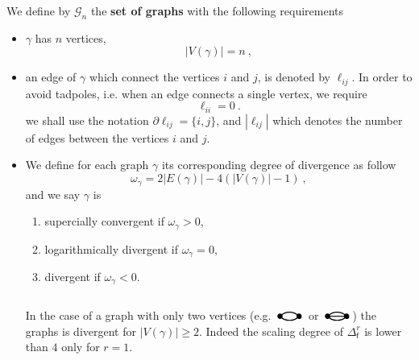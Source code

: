\documentclass[11pt]{book}
\newcommand{\abs}[1]{\left|#1\right|}
\newcommand{\Gcal}{\mathcal{G}}
\newcommand{\fsf}{\mathsf{f}}
\theoremstyle{break}
\newcommand{\FtwoG}{\begin{tikzpicture}[thick,scale=1.5]
\useasboundingbox (-0.1,-0.07) rectangle (0.5,0.4);
\filldraw (0,0) circle (1.3pt);
\filldraw (0.4,0) circle (1.3pt);
\draw (0,0) edge [out=45,in=135] node[above] {} (0.4,0);
\draw (0,0) edge [out=-45,in=-135] node[above] {} (0.4,0);
\end{tikzpicture} }
\newcommand{\FthreeG}{\begin{tikzpicture}[thick,scale=1.5]
\useasboundingbox (-0.1,-0.07) rectangle (0.5,0.4);
\filldraw (0,0) circle (1.3pt);
\filldraw (0.4,0) circle (1.3pt);
\draw (0,0) edge [out=45,in=135] node[above] {} (0.4,0);
\draw (0,0) -- (0.4,0);
\draw (0,0) edge [out=-45,in=-135] node[above] {} (0.4,0);
\end{tikzpicture} }
\begin{document}
We define by $\Gcal_n$ the \textbf{set of graphs} with the following requirements
%
\begin{itemize}
\item $\gamma$ has $n$ vertices, 
%
\begin{equation*}
\abs{V(\gamma)} = n \ ,
\end{equation*}
%
%
\item an edge of $\gamma$ which connect the vertices $i$ and $j$, is denoted by $\ell_{ij}$. In order to avoid tadpoles, i.e. when an edge connects a single vertex, we require
%
\begin{equation*}
\ell_{ii} = 0 \ .
\end{equation*}
%
we shall use the notation $\partial \ell_{ij} = \{i,j\}$, and $\abs{\ell_{ij}}$ which denotes the number of edges between the vertices $i$ and $j$.
%
%
\item We define for each graph $\gamma$ its corresponding degree of divergence as follow
%
\begin{equation}
\omega_\gamma = 2 \abs{E(\gamma)} - 4(\abs{V(\gamma)} - 1) \ ,
\label{eq:deg_div_graph}
\end{equation}
%
and we say $\gamma$ is
\begin{enumerate}
\item supercially convergent if $\omega_\gamma  > 0$, 
\item logarithmically divergent if $\omega_\gamma = 0$,
\item divergent if $\omega_\gamma < 0$. 
\end{enumerate}
%
In the case of a graph with only two vertices (e.g. $\FtwoG$ or $\FthreeG$) the graphs is divergent for $\abs{V(\gamma)} \geq 2$. Indeed the scaling degree of $\Delta_\fsf^r$ is lower than $4$ only for $r=1$.
\end{itemize}


\bigskip
\end{document}
